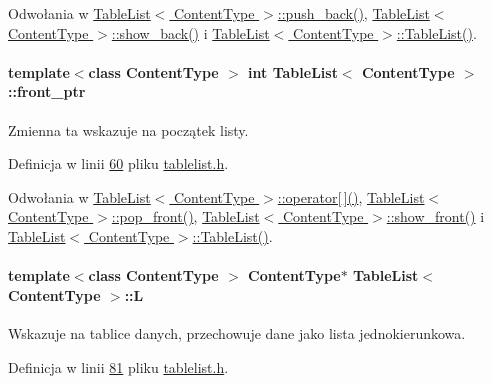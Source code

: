 Odwołania w \hyperlink{tablelist_8h_source_l00188}{Table\-List$<$ Content\-Type $>$\-::push\-\_\-back()}, \hyperlink{tablelist_8h_source_l00177}{Table\-List$<$ Content\-Type $>$\-::show\-\_\-back()} i \hyperlink{tablelist_8h_source_l00093}{Table\-List$<$ Content\-Type $>$\-::\-Table\-List()}.

\hypertarget{class_table_list_a91f5e1b1f71e168541fca858c41a205d}{
\paragraph[{front\-\_\-ptr}]{\setlength{\rightskip}{0pt plus 5cm}template$<$class Content\-Type $>$ int {\bf Table\-List}$<$ Content\-Type $>$\-::front\-\_\-ptr}}\label{class_table_list_a91f5e1b1f71e168541fca858c41a205d}
Zmienna ta wskazuje na początek listy. 

Definicja w linii \hyperlink{tablelist_8h_source_l00060}{60} pliku \hyperlink{tablelist_8h_source}{tablelist.\-h}.



Odwołania w \hyperlink{tablelist_8h_source_l00263}{Table\-List$<$ Content\-Type $>$\-::operator\mbox{[}$\,$\mbox{]}()}, \hyperlink{tablelist_8h_source_l00160}{Table\-List$<$ Content\-Type $>$\-::pop\-\_\-front()}, \hyperlink{tablelist_8h_source_l00138}{Table\-List$<$ Content\-Type $>$\-::show\-\_\-front()} i \hyperlink{tablelist_8h_source_l00093}{Table\-List$<$ Content\-Type $>$\-::\-Table\-List()}.

\hypertarget{class_table_list_a18c24d5cce01d71624b04434ad4e5b91}{
\paragraph[{L}]{\setlength{\rightskip}{0pt plus 5cm}template$<$class Content\-Type $>$ Content\-Type$\ast$ {\bf Table\-List}$<$ Content\-Type $>$\-::L}}\label{class_table_list_a18c24d5cce01d71624b04434ad4e5b91}
Wskazuje na tablice danych, przechowuje dane jako lista jednokierunkowa. 

Definicja w linii \hyperlink{tablelist_8h_source_l00081}{81} pliku \hyperlink{tablelist_8h_source}{tablelist.\-h}.



